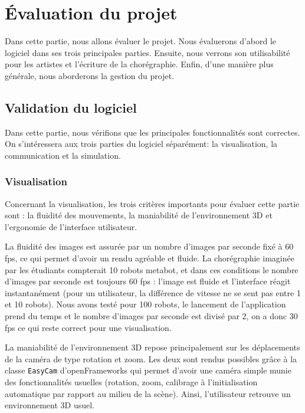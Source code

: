 \section{Évaluation du projet}

Dans cette partie, nous allons évaluer le projet. Nous évaluerons d'abord le logiciel dans ses trois principales parties. Ensuite, nous verrons son utilisabilité pour les artistes et l'écriture de la chorégraphie. Enfin, d'une manière plus générale, nous aborderons la gestion du projet. 

\subsection{Validation du logiciel} %

Dans cette partie, nous vérifions que les principales fonctionnalités sont correctes. On s'intéressera aux trois parties du logiciel séparément: la visualisation, la communication et la simulation. 

\subsubsection{Visualisation}

Concernant la visualisation, les trois critères importants pour évaluer cette partie sont : la fluidité des mouvements, la maniabilité de l'environnement 3D et l'ergonomie de l'interface utilisateur. 

La fluidité des images est assurée par un nombre d'images par seconde fixé à 60 fps, ce qui permet d'avoir un rendu agréable et fluide. La chorégraphie imaginée par les étudiants compterait 10 robots metabot, et dans ces conditions le nombre d'images par seconde est toujours 60 fps : l'image est fluide et l'interface réagit instantanément (pour un utilisateur, la différence de vitesse ne se sent pas entre 1 et 10 robots).
Nous avons testé pour 100 robots, le lancement de l'application prend du temps et le nombre d'images par seconde est divisé par 2, on a donc 30 fps ce qui reste correct pour une visualisation. 

La maniabilité de l'environnement 3D repose principalement sur les déplacements de la caméra de type rotation et zoom. Les deux sont rendus possibles grâce à la classe \verb|EasyCam| d'openFrameworks qui permet d'avoir une caméra simple munie des fonctionnalités usuelles (rotation, zoom, calibrage à l'initialisation automatique par rapport au milieu de la scène). Ainsi, l'utilisateur retrouve un environnement 3D usuel.

